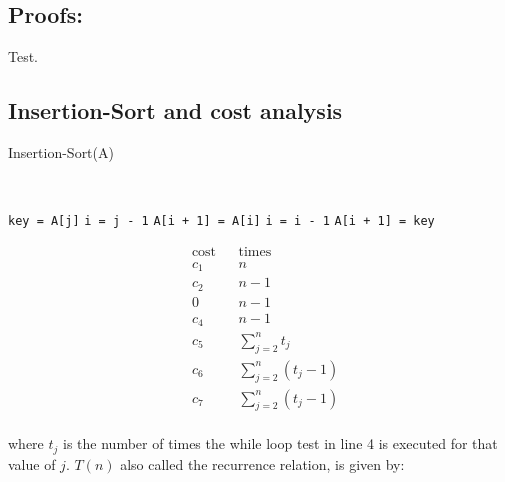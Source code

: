 \subsection{Proofs:}
Test.

\subsection{Insertion-Sort and cost analysis}

\begin{algorithm}[H]
  \caption{Insertion-Sort(A)}
  \AlgoTopMargin
   \\
  \begin{multicols}{2}
    \begin{algorithmic}[1]
      \State \texttt{key = A[j]}
      \State \texttt{i = j - 1}
      \State \texttt{A[i + 1] = A[i]}
      \State \texttt{i = i - 1}
      \EndWhile
      \State \texttt{A[i + 1] = key}
      \EndFor
    \end{algorithmic}

    \columnbreak
    \vspace*{-8.8em}
    \begin{align*}
       & \text{cost} &  & \text{times}                       \\[3.8em]
       & c_1         &  & n                                  \\[-0.4em]
       & c_2         &  & n - 1                              \\[-0.2em]
       & 0           &  & n - 1                              \\[-0.3em]
       & c_4         &  & n - 1                              \\[0.68em]
       & c_5         &  & \textstyle \sum_{j=2}^{n}t_j       \\[-0.3em]
       & c_6         &  & \textstyle \sum_{j=2}^{n}(t_j - 1) \\[-0.4em]
       & c_7         &  & \textstyle \sum_{j=2}^{n}(t_j - 1) \\
    \end{align*}
  \end{multicols}
\end{algorithm}
where $t_j$ is the number of times the while loop test in line 4 is executed for that value of $j$. $T(n)$ also called the recurrence relation, is given by:
